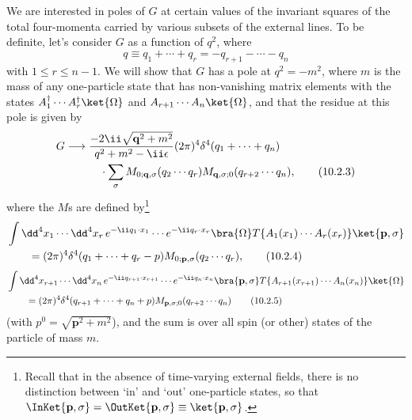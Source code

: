 We are interested in poles of $G$ at certain values of the invariant squares
of the total four-momenta carried by various subsets of the external lines.
To be definite, let's consider $G$ as a function of $q^2$, where
\begin{equation}
  q\equiv q_1+\cdots+q_r=-q_{r+1}-\cdots-q_n
  \tag{10.2.2}\label{eq:10.2.2}
\end{equation}
with $1\leq r\leq n-1$. We will show that $G$ has a pole at $q^2=-m^2$, where $m$ is
the mass of any one-particle state that has non-vanishing matrix elements
with the states $A_1^\dagger\cdots A_r^\dagger\ket{\Omega}$ and
$A_{r+1}\cdots A_n\ket{\Omega}$, and that the residue at this
pole is given by
\begin{align}
  G\longrightarrow{}&
  \frac{-2\ii\sqrt{\mathbf q^2+m^2}}{q^2+m^2-\ii\epsilon}
  (2\pi)^4\delta^4(q_1+\cdots+q_n)
  \notag\\
  &\quad\cdot\sum_\sigma
  M_{0;\mathbf q,\sigma}(q_2\cdots q_r)
  M_{\mathbf q,\sigma;0}(q_{r+2}\cdots q_n),
  \tag{10.2.3}\label{eq:10.2.3}
\end{align}
where the $M$s are defined by\footnote{Recall that in the absence of time-varying
external fields, there is no distinction between `in' and `out' one-particle
states, so that $\InKet{\mathbf p,\sigma}
=\OutKet{\mathbf p,\sigma}
\equiv\ket{\mathbf p,\sigma}$.}
\begin{align}
  &\int \dd^4x_1\cdots \dd^4x_r\,
  e^{-\ii q_1\cdot x_1}\cdots e^{-\ii q_r\cdot x_r}
  \bra{\Omega}T\{A_1(x_1)\cdots A_r(x_r)\}\ket{\mathbf p,\sigma}
  \notag\\
  &\qquad=(2\pi)^4\delta^4(q_1+\cdots+q_r-p)
  M_{0;\mathbf p,\sigma}(q_2\cdots q_r),
  \tag{10.2.4}\label{eq:10.2.4}
\end{align}
\begin{align}
  &\int \dd^4x_{r+1}\cdots \dd^4x_n\,
  e^{-\ii q_{r+1}\cdot x_{r+1}}\cdots e^{-\ii q_n\cdot x_n}
  \bra{\mathbf p,\sigma}T\{A_{r+1}(x_{r+1})\cdots A_n(x_n)\}\ket{\Omega}
  \notag\\
  &\qquad=(2\pi)^4\delta^4(q_{r+1}+\cdots+q_n+p)
  M_{\mathbf p,\sigma;0}(q_{r+2}\cdots q_n)
  \tag{10.2.5}\label{eq:10.2.5}
\end{align}
(with $p^0=\sqrt{\mathbf p^2+m^2}$), and the sum is over all spin (or other) states of the
particle of mass $m$.

